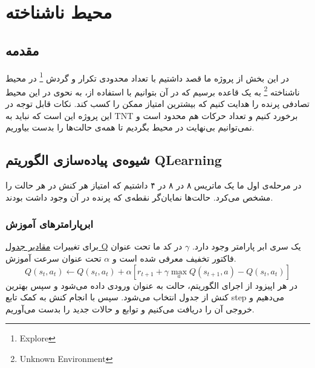 \documentclass[11pt, a4paper, oneside]{report}
\begin{document}
	
		
		
		
		
		
	\chapter{محیط ناشناخته}
	\section{مقدمه}
	در این بخش از پروژه ما قصد داشتیم با تعداد محدودی تکرار و گردش \footnote{Explore} در محیط ناشناخته
	\footnote{Unknown Environment}
	به یک قاعده برسیم که در آن بتوانیم با استفاده از، به نحوی در این محیط تصادفی پرنده را هدایت کنیم که بیشترین امتیاز ممکن را کسب کند. نکات قابل توجه در این پروژه این است که نباید به TNT برخورد کنیم و تعداد حرکات هم محدود است و نمی‌توانیم بی‌نهایت در محیط بگردیم تا همه‌ی حالت‌ها را بدست بیاوریم.
	
	\section{شیوه‌ی پیاده‌سازی الگوریتم QLearning}
	در مرحله‌ی اول ما یک ماتریس ۸ در ۸ در ۴ داشتیم که امتیاز هر کنش در هر حالت را مشخص می‌کرد. حالت‌ها نمایان‌گر نقطه‌ی که پرنده در آن وجود داشت بودند.
	\subsection{ابرپارامترهای آموزش}
	برای تغییرات 
	  \href{https://www.geeksforgeeks.org/q-learning-in-python/}{مقادیر جدول Q} 
	  یک سری ابر پارامتر وجود دارد.  $\gamma$ در کد ما تحت عنوان فاکتور تخفیف معرفی شده است و $\alpha$  تحت عنوان سرعت آموزش.
	\begin{equation}
		Q(s_t, a_t) \leftarrow Q(s_t, a_t) + \alpha \left[ r_{t+1} + \gamma \max_{a} Q(s_{t+1}, a) - Q(s_t, a_t) \right]
	\end{equation}
	در هر اپیزود از اجرای الگوریتم، حالت به عنوان ورودی داده می‌شود و سپس بهترین کنش از جدول انتخاب می‌شود. سپس با انجام کنش به کمک تابع step می‌دهیم و خروجی آن را دریافت می‌کنیم و توابع و حالات جدید را بدست می‌آوریم.
	 

	 	
\end{document}

